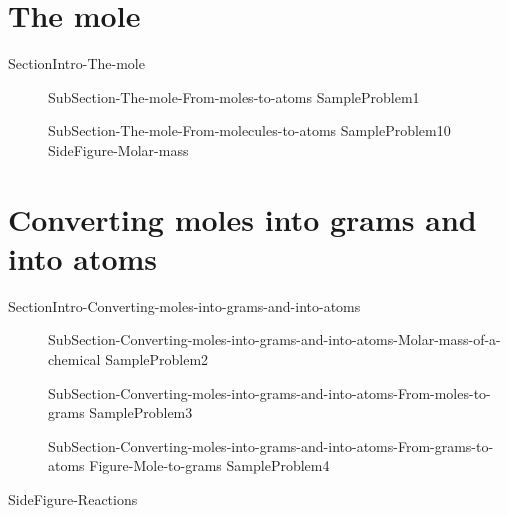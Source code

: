 \documentclass[main.tex]{subfiles}
\newcommand\chapterlabel{Ch-mole}\setcounter{figurenewcounter}{0}\setcounter{tablenewcounter}{0}\setcounter{formulanewcounter}{0}\chapterpicture{../{\chapterlabel}/figure1}\chapterpicturelabel{PngImg}
\begin{document}
\section{The mole}{SectionIntro-The-mole}
\sloppy \begin{description}
\item[] {SubSection-The-mole-From-moles-to-atoms}
\hspace{-3cm}{Figure-The-mole}
{SampleProblem1}
\item[] {SubSection-The-mole-From-molecules-to-atoms}
{SampleProblem10}
{SideFigure-Molar-mass}
\end{description}
	



\section{Converting moles into grams and into atoms}{SectionIntro-Converting-moles-into-grams-and-into-atoms}
\sloppy \begin{description}
\item[] {SubSection-Converting-moles-into-grams-and-into-atoms-Molar-mass-of-a-chemical}
{SampleProblem2}
\item[] {SubSection-Converting-moles-into-grams-and-into-atoms-From-moles-to-grams}
 \hspace{2cm}{Figure-Mole-equivalency}
{SampleProblem3}
\item[] {SubSection-Converting-moles-into-grams-and-into-atoms-From-grams-to-atoms}
{Figure-Mole-to-grams}
{SampleProblem4}
\end{description}




 {SideFigure-Reactions}
\end{document}
